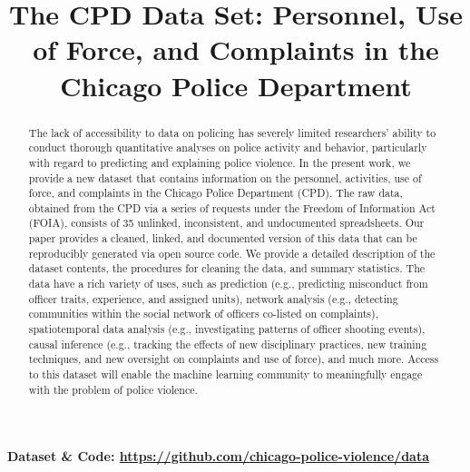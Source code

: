 \documentclass{article}
\title{The CPD Data Set: Personnel, Use of Force, and Complaints in the Chicago Police Department}
\begin{document}
\maketitle

\begin{abstract}
The lack of accessibility to data on policing has severely limited researchers’
ability to conduct thorough quantitative analyses on police activity and
behavior, particularly with regard to predicting and explaining police
violence. In the present work, we provide a new dataset that contains
information on the personnel, activities, use of force, and complaints in the
Chicago Police Department (CPD). The raw data, obtained from the CPD via a
series of requests under the Freedom of Information Act (FOIA), consists of 35
unlinked, inconsistent, and undocumented spreadsheets. Our paper provides a
cleaned, linked, and documented version of this data that can be reproducibly
generated via open source code. We provide a detailed description of the
dataset contents, the procedures for cleaning the data, and summary statistics.
The data have a rich variety of uses, such as prediction (e.g., predicting
misconduct from officer traits, experience, and assigned units), network
analysis (e.g., detecting communities within the social network of officers
co-listed on complaints), spatiotemporal data analysis (e.g., investigating
patterns of officer shooting events), causal inference (e.g., tracking the
effects of new disciplinary practices, new training techniques, and new
oversight on complaints and use of force), and much more. Access to this
dataset will enable the machine learning community to meaningfully engage with
the problem of police violence.
\end{abstract}

\textbf{Dataset \& Code: \url{https://github.com/chicago-police-violence/data}}








%
%




\appendix


\end{document}
